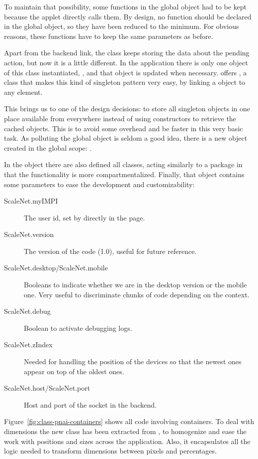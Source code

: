 To maintain that possibility, some functions in the global object had to be kept because the applet directly calls them.
By design, no function should be declared in the global object, so they have been reduced to the minimum.
For obvious reasons, these functions have to keep the same parameters as before.

Apart from the backend link, the  class keeps storing the data about the pending action, but now it is a little different.
In the application there is only one object of this class instantiated, , and that object is updated when necessary.
 offers , a class that makes this kind of singleton pattern very easy, by linking a  object to any  element.

This brings us to one of the design decisions: to store all singleton objects in one place available from everywhere instead of using constructors to retrieve the cached objects.
This is to avoid some overhead and be faster in this very basic task.
As polluting the global object is seldom a good idea, there is a new object created in the global scope: .

In the  object there are also defined all  classes, acting similarly to a  package in that the functionality is more compartmentalized.
Finally, that object contains some parameters to ease the development and customizability:

\begin{description}
  \item[ScaleNet.myIMPI] The user id, set by  directly in the page.
  \item[ScaleNet.version] The version of the code (1.0), useful for future reference.
  \item[ScaleNet.desktop/ScaleNet.mobile] Booleans to indicate whether we are in the desktop version or the mobile one.
  Very useful to discriminate chunks of code depending on the context.
  \item[ScaleNet.debug] Boolean to activate debugging logs.
  \item[ScaleNet.zIndex] Needed for handling the position of the devices so that the newest ones appear on top of the oldest ones.
  \item[ScaleNet.host/ScaleNet.port] Host and port of the socket in the backend.
\end{description}

Figure~\ref{fig:class-pnai-containers} shows all code involving containers.
To deal with dimensions the new  class has been extracted from , to homogenize and ease the work with positions and sizes across the application.
Also, it encapsulates all the logic needed to transform dimensions between pixels and percentages.

